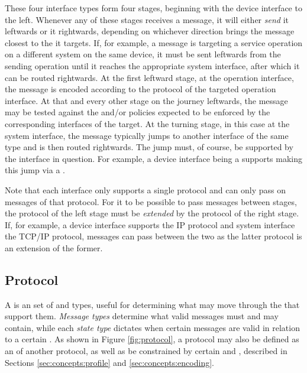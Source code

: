 These four interface types form four stages, beginning with the device interface to the left.
Whenever any of these stages receives a message, it will either \textit{send} it leftwards or  it rightwards, depending on whichever direction brings the message closest to the  it targets.
If, for example, a message is targeting a service operation on a different system on the same device, it must be sent leftwards from the sending operation until it reaches the appropriate system interface, after which it can be routed rightwards.
At the first leftward stage, at the operation interface, the message is encoded according to the protocol of the targeted operation interface.
At that and every other stage on the journey leftwards, the message may be tested against the  and/or policies expected to be enforced by the corresponding interfaces of the target.
At the turning stage, in this case at the system interface, the message typically jumps to another interface of the same type and is then routed rightwards.
The jump must, of course, be supported by the interface in question.
For example, a device interface being a  supports making this jump via a .

Note that each interface only supports a single protocol and can only pass on messages of that protocol.
For it to be possible to pass messages between stages, the protocol of the left stage must be \textit{extended} by the protocol of the right stage.
If, for example, a device interface supports the IP protocol \cite{deering2017internet} and system interface the TCP/IP \cite{postel1981transmission} protocol, messages can pass between the two as the latter protocol is an extension of the former.

\subsection{Protocol}
\label{sec:concepts:protocol}

A  is an  set of  and  types, useful for determining what  may move through the  that support them.
\textit{Message types} determine what  valid messages must and may contain, while each \textit{state type} dictates when certain messages are valid in relation to a certain .
As shown in Figure \ref{fig:protocol}, a protocol may also be defined as an  of another protocol, as well as be constrained by certain  and , described in Sections \ref{sec:concepts:profile} and \ref{sec:concepts:encoding}.

